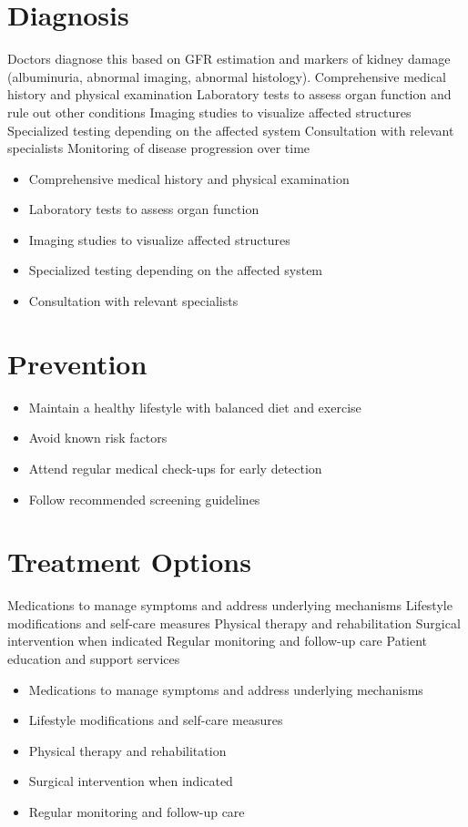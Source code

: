 \section{Diagnosis}
Doctors diagnose this based on GFR estimation and markers of kidney damage (albuminuria, abnormal imaging, abnormal histology). Comprehensive medical history and physical examination Laboratory tests to assess organ function and rule out other conditions Imaging studies to visualize affected structures Specialized testing depending on the affected system Consultation with relevant specialists Monitoring of disease progression over time

\begin{itemize}[noitemsep]
  \item Comprehensive medical history and physical examination
  \item Laboratory tests to assess organ function
  \item Imaging studies to visualize affected structures
  \item Specialized testing depending on the affected system
  \item Consultation with relevant specialists
\end{itemize}
\section{Prevention}
\begin{itemize}[noitemsep]
  \item Maintain a healthy lifestyle with balanced diet and exercise
  \item Avoid known risk factors
  \item Attend regular medical check-ups for early detection
  \item Follow recommended screening guidelines
\end{itemize}
\section{Treatment Options}
Medications to manage symptoms and address underlying mechanisms Lifestyle modifications and self-care measures Physical therapy and rehabilitation Surgical intervention when indicated Regular monitoring and follow-up care Patient education and support services

\begin{itemize}[noitemsep]
  \item Medications to manage symptoms and address underlying mechanisms
  \item Lifestyle modifications and self-care measures
  \item Physical therapy and rehabilitation
  \item Surgical intervention when indicated
  \item Regular monitoring and follow-up care
\end{itemize}
